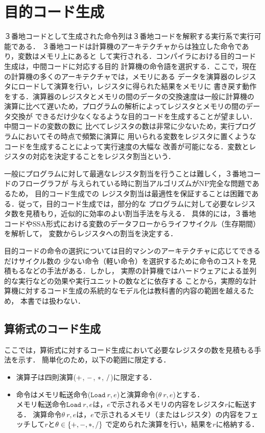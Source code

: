 \documentclass[dvipdfmx,a4j]{jbook}
\begin{document}
\chapter{目的コード生成}

３番地コードとして生成された命令列は３番地コードを解釈する実行系で実行可能である．
３番地コードは計算機のアーキテクチャからは独立した命令であり，変数はメモリ上にあると
して実行される．コンパイラにおける目的コード生成は，中間コードに対応する目的
計算機の命令語を選択する．ここで，現在の計算機の多くのアーキテクチャでは，メモリにある
データを演算器のレジスタにロードして演算を行い，レジスタに得られた結果をメモリに
書き戻す動作をする．演算器のレジスタとメモリの間のデータの交換速度は一般に計算機の
演算に比べて遅いため，プログラムの解析によってレジスタとメモリの間のデータ交換が
できるだけ少なくなるような目的コードを生成することが望ましい．中間コードの変数の数に
比べてレジスタの数は非常に少ないため，実行プログラムにおいてその時点で頻繁に演算に
用いられる変数をレジスタに置くようなコードを生成することによって実行速度の大幅な
改善が可能になる．変数とレジスタの対応を決定することをレジスタ割当という．

一般にプログラムに対して最適なレジスタ割当を行うことは難しく，３番地コードのフローグラフが
与えられている時に割当アルゴリズムがNP完全な問題である\cite{DBLP:journals/cl/ChaitinACCHM81}ため，
目的コード生成での
レジスタ割当は最適性を保証することは困難である．従って，目的コード生成では，部分的な
プログラムに対して必要なレジスタ数を見積もり，近似的に効率のよい割当手法を与える．
具体的には，３番地コードやSSA形式における変数のデータフローからライフサイクル（生存期間）を解析して，
変数からレジスタへの割当を決定する．

目的コードの命令の選択については目的マシンのアーキテクチャに応じてできるだけサイクル数の
少ない命令（軽い命令）を選択するために命令のコストを見積もるなどの手法がある．しかし，
実際の計算機ではハードウェアによる並列的な実行などの効果や実行ユニットの数などに依存する
ことから，実際的な計算機に対するコード生成の系統的なモデル化は教科書的内容の範囲を越えるため，
本書では扱わない．

\section{算術式のコード生成}

ここでは，算術式に対するコード生成において必要なレジスタの数を見積もる手法を示す．
簡単化のため，以下の範囲に限定する．
\begin{itemize}
    \item 演算子は四則演算(${\tt +}$, ${\tt -}$, ${\tt *}$, ${\tt /}$)に限定する．
    \item 命令はメモリ転送命令($\texttt{Load}\ r,e$)と演算命令($\theta\ r,e$)とする．\\
          メモリ転送命令$\texttt{Load}\ r,e$は，$e$で示されるメモリの内容をレジスタ$r$に転送する．
          演算命令$\theta\ r,e$は，$e$で示されるメモリ（またはレジスタ）の内容をフェッチして$r$と$\theta\in\{{\tt +},{\tt -},{\tt *},{\tt /}\}$
          で定められた演算を行い，結果を$r$に格納する．
\end{itemize}
\end{document}
